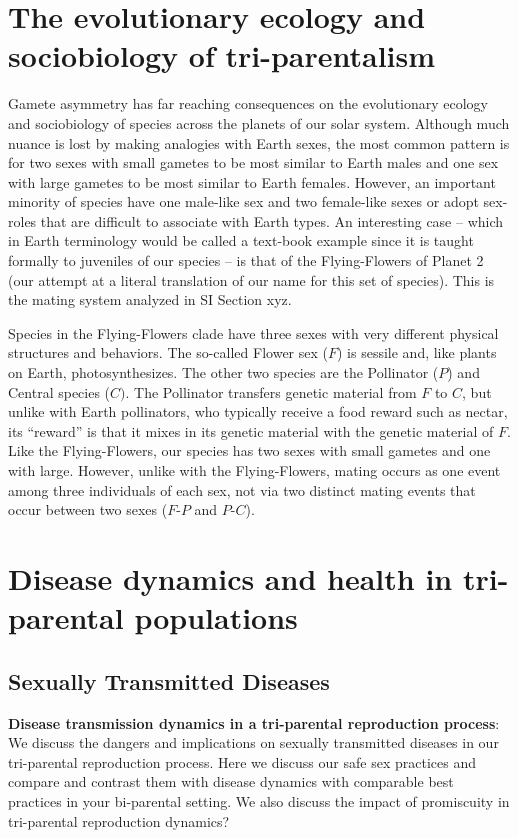 \documentclass{report}
\begin{document}
\section*{The evolutionary ecology and sociobiology of tri-parentalism}
Gamete asymmetry has far reaching consequences on the evolutionary ecology and sociobiology of species across the planets of our solar system. Although much nuance is lost by making analogies with Earth sexes, the most common pattern is for two sexes with small gametes to be most similar to Earth males and one sex with large gametes to be most similar to Earth females. However, an important minority of species have one male-like sex and two female-like sexes or adopt sex-roles that are difficult to associate with Earth types. An interesting case -- which in Earth terminology would be called a text-book example since it is taught formally to juveniles of our species -- is that of the Flying-Flowers of Planet 2 (our attempt at a literal translation of our name for this set of species). This is the mating system analyzed in SI Section xyz.

Species in the Flying-Flowers clade have three sexes with very different physical structures and behaviors. The so-called Flower sex ($F$) is sessile and, like plants on Earth, photosynthesizes. The other two species are the Pollinator ($P$) and Central species ($C)$. The Pollinator transfers genetic material from $F$ to $C$, but unlike with Earth pollinators, who typically receive a food reward such as nectar, its ``reward'' is that it mixes in its genetic material with the genetic material of $F$. Like the Flying-Flowers, our species has two sexes with small gametes and one with large. However, unlike with the Flying-Flowers, mating occurs as one event among three individuals of each sex, not via two distinct mating events that occur between two sexes ($F$-$P$ and $P$-$C$).

\section*{Disease dynamics and health in tri-parental populations}

\subsection*{Sexually Transmitted Diseases}
\textbf{Disease transmission dynamics in a tri-parental reproduction process}: We discuss the dangers and implications on sexually transmitted diseases in our tri-parental reproduction process. Here we discuss our safe sex practices and compare and contrast them with disease dynamics with comparable best practices in your bi-parental setting. We also discuss the impact of promiscuity in tri-parental reproduction dynamics? 
\end{document}
